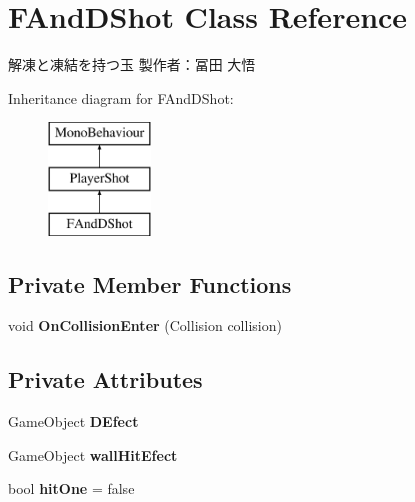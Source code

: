 \hypertarget{class_f_and_d_shot}{}\section{F\+And\+D\+Shot Class Reference}
\label{class_f_and_d_shot}


解凍と凍結を持つ玉 製作者：冨田 大悟  


Inheritance diagram for F\+And\+D\+Shot\+:\begin{figure}[H]
\begin{center}
\leavevmode
\includegraphics[height=3.000000cm]{class_f_and_d_shot}
\end{center}
\end{figure}
\subsection*{Private Member Functions}
\begin{DoxyCompactItemize}
\item 
\mbox{\label{class_f_and_d_shot_a486ffbfdb8e305af2e4ecea9cef9e1f5}} 
void {\bfseries On\+Collision\+Enter} (Collision collision)
\end{DoxyCompactItemize}
\subsection*{Private Attributes}
\begin{DoxyCompactItemize}
\item 
\mbox{\label{class_f_and_d_shot_a1be13222a3c9e77b9d034c41ba340561}} 
Game\+Object {\bfseries D\+Efect}
\item 
\mbox{\label{class_f_and_d_shot_aa1cc14a8ca392526ab004470ead27369}} 
Game\+Object {\bfseries wall\+Hit\+Efect}
\item 
\mbox{\label{class_f_and_d_shot_a89551f706d03023778f2c04cd43d5dde}} 
bool {\bfseries hit\+One} = false
\end{DoxyCompactItemize}
